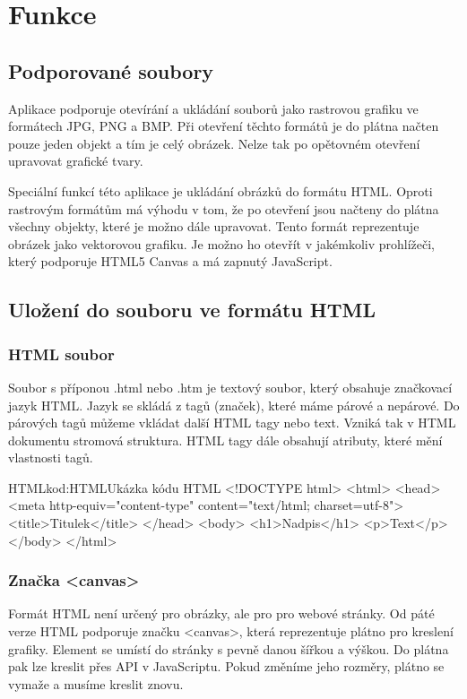 \documentclass[
  field=inf,
  biblatex,
  glossaries,
  index
]{kidiplom}
\begin{document}
\section{Funkce}

\subsection{Podporované soubory}

Aplikace podporuje otevírání a ukládání souborů jako rastrovou grafiku ve formátech JPG, PNG a BMP. Při otevření těchto formátů je do plátna načten pouze jeden objekt a tím je celý obrázek. Nelze tak po opětovném otevření upravovat grafické tvary. 

Speciální funkcí této aplikace je ukládání obrázků do formátu HTML. Oproti rastrovým formátům má výhodu v tom, že po otevření jsou načteny do plátna všechny objekty, které je možno dále upravovat. Tento formát reprezentuje obrázek jako vektorovou grafiku. Je možno ho otevřít v jakémkoliv prohlížeči, který podporuje HTML5 Canvas a má zapnutý JavaScript.

\subsection{Uložení do souboru ve formátu HTML}

\subsubsection{HTML soubor}

Soubor s příponou .html nebo .htm je textový soubor, který obsahuje značkovací jazyk HTML. Jazyk se skládá z tagů (značek), které máme párové a nepárové. Do párových tagů můžeme vkládat další HTML tagy nebo text. Vzniká tak v HTML dokumentu stromová struktura. HTML tagy dále obsahují atributy, které mění vlastnosti tagů.

\begin{kicode}{HTML}{kod:HTML}{Ukázka kódu HTML}
<!DOCTYPE html>
<html>
  <head>
  <meta http-equiv="content-type" content="text/html; charset=utf-8">
  <title>Titulek</title>
  </head>
  <body>
    <h1>Nadpis</h1>
    <p>Text</p>
  </body>
</html>
\end{kicode}

\subsubsection{Značka <canvas>}

Formát HTML není určený pro obrázky, ale pro pro webové stránky. Od páté verze HTML podporuje značku <canvas>, která reprezentuje plátno pro kreslení grafiky. Element se umístí do stránky s pevně danou šířkou a výškou. Do plátna pak lze kreslit přes API v JavaScriptu. Pokud změníme jeho rozměry, plátno se vymaže a musíme kreslit znovu.
\end{document}
